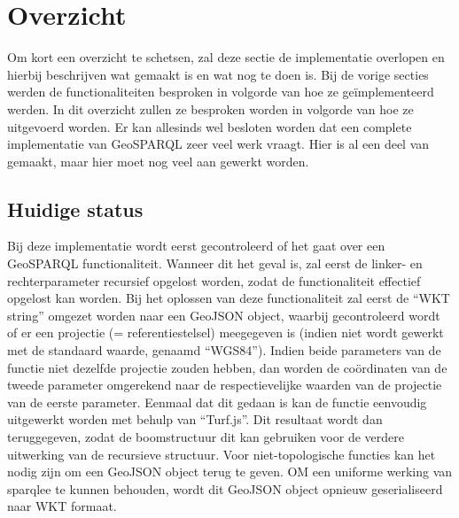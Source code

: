 \section{Overzicht}
\label{sec:impl_overzicht}
Om kort een overzicht te schetsen, zal deze sectie de implementatie overlopen en hierbij beschrijven wat gemaakt is en wat nog te doen is. Bij de vorige secties werden de functionaliteiten besproken in volgorde van hoe ze geïmplementeerd werden. In dit overzicht zullen ze besproken worden in volgorde van hoe ze uitgevoerd worden. Er kan allesinds wel besloten worden dat een complete implementatie van GeoSPARQL zeer veel werk vraagt. Hier is al een deel van gemaakt, maar hier moet nog veel aan gewerkt worden.

\subsection{Huidige status}
Bij deze implementatie wordt eerst gecontroleerd of het gaat over een GeoSPARQL functionaliteit. Wanneer dit het geval is, zal eerst de linker- en rechterparameter recursief opgelost worden, zodat de functionaliteit effectief opgelost kan worden. Bij het oplossen van deze functionaliteit zal eerst de ``WKT string'' omgezet worden naar een GeoJSON object, waarbij gecontroleerd wordt of er een projectie (= referentiestelsel) meegegeven is (indien niet wordt gewerkt met de standaard waarde, genaamd ``WGS84''). Indien beide parameters van de functie niet dezelfde projectie zouden hebben, dan worden de coördinaten van de tweede parameter omgerekend naar de respectievelijke waarden van de projectie van de eerste parameter. Eenmaal dat dit gedaan is kan de functie eenvoudig uitgewerkt worden met behulp van ``Turf.js''. Dit resultaat wordt dan teruggegeven, zodat de boomstructuur dit kan gebruiken voor de verdere uitwerking van de recursieve structuur. Voor niet-topologische functies kan het nodig zijn om een GeoJSON object terug te geven. OM een uniforme werking van sparqlee te kunnen behouden, wordt dit GeoJSON object opnieuw geserialiseerd naar WKT formaat. 

